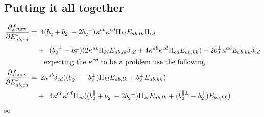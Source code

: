 \documentclass[11pt]{article}
\begin{document}
\subsection{Putting it all together}
\begin{align}
    \pdv{f_\text{curv}}{E_{ab,cd}^*}=&\enspace 4(b_2^\parallel + b_2^\perp - 2b_2^{\parallel\perp})\kappa^{ab}\kappa^{cd} \Pi_{kl}E_{ab,lk}\Pi_{cd} \\
    &+\enspace (b_2^{\parallel\perp} - b_2^\perp)(2\kappa^{ab} \Pi_{kl}E_{ab,lk} \delta_{cd} + 4\kappa^{ab}\kappa^{cd} \Pi_{cd}E_{ab,kk}) + 2b_2^\perp \kappa^{ab} E_{ab,kk} \delta_{cd} \nonumber \\
    &\qq{expecting the $\kappa^{cd}$ to be a problem use the following} \nonumber \\
    \pdv{f_\text{curv}}{E_{ab,cd}^*}=&\enspace 2\kappa^{ab}\delta_{cd} ((b_2^{\parallel\perp}-b_2^\perp)\Pi_{kl}E_{ab,lk}+b_2^\perp E_{ab,kk}) \\
    &+\enspace 4\kappa^{ab}\kappa^{cd} \Pi_{cd} ((b_2^\parallel + b_2^\perp - 2b_2^{\parallel\perp})\Pi_{kl}E_{ab,lk} + (b_2^{\parallel\perp}-b_2^\perp)E_{ab,kk}) \nonumber
\end{align}
so
\end{document}
